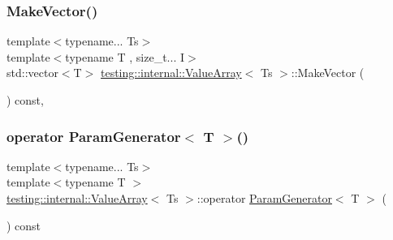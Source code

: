 \subsubsection{\texorpdfstring{MakeVector()}{MakeVector()}\hspace{0.1cm}{\footnotesize\ttfamily [2/2]}}
{\footnotesize\ttfamily template$<$typename... Ts$>$ \\
template$<$typename T , size\+\_\+t... I$>$ \\
std\+::vector$<$T$>$ \mbox{\hyperlink{classtesting_1_1internal_1_1_value_array}{testing\+::internal\+::\+Value\+Array}}$<$ Ts $>$\+::Make\+Vector (\begin{DoxyParamCaption}\item[{\mbox{\hyperlink{structtesting_1_1internal_1_1_index_sequence}{Index\+Sequence}}$<$ I... $>$}]{ }\end{DoxyParamCaption}) const\hspace{0.3cm}{\ttfamily [inline]}, {\ttfamily [private]}}

\mbox{\label{classtesting_1_1internal_1_1_value_array_a019560f10debdce5f47bb18c0e5261b5}} 
\subsubsection{\texorpdfstring{operator ParamGenerator$<$ T $>$()}{operator ParamGenerator< T >()}\hspace{0.1cm}{\footnotesize\ttfamily [1/2]}}
{\footnotesize\ttfamily template$<$typename... Ts$>$ \\
template$<$typename T $>$ \\
\mbox{\hyperlink{classtesting_1_1internal_1_1_value_array}{testing\+::internal\+::\+Value\+Array}}$<$ Ts $>$\+::operator \mbox{\hyperlink{classtesting_1_1internal_1_1_param_generator}{Param\+Generator}}$<$ T $>$ (\begin{DoxyParamCaption}{ }\end{DoxyParamCaption}) const\hspace{0.3cm}{\ttfamily [inline]}}

\mbox{\label{classtesting_1_1internal_1_1_value_array_a019560f10debdce5f47bb18c0e5261b5}} 
